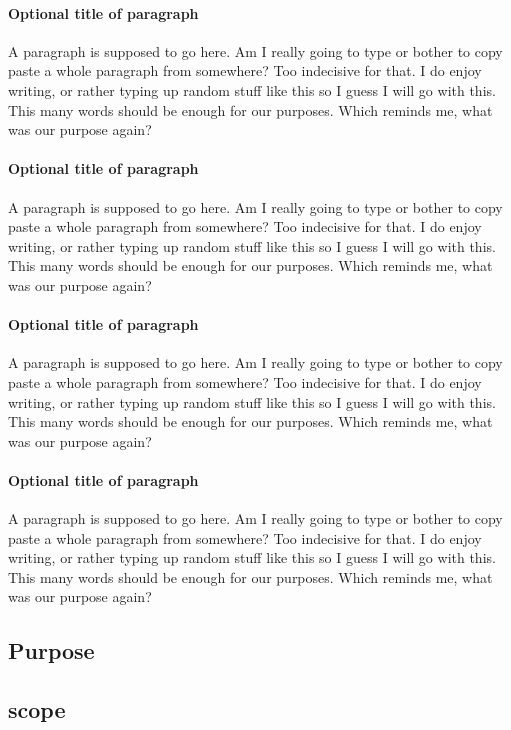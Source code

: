 \documentclass{article}
\begin{document}
	\paragraph{Optional title of paragraph}
	A paragraph is supposed to go here. Am I really going to type or bother to copy paste a whole paragraph from somewhere? Too indecisive for that. I do enjoy writing, or rather typing up random stuff like this so I guess I will go with this. This many words should be enough for our purposes. Which reminds me, what was our purpose again?

	\paragraph{Optional title of paragraph}
	A paragraph is supposed to go here. Am I really going to type or bother to copy paste a whole paragraph from somewhere? Too indecisive for that. I do enjoy writing, or rather typing up random stuff like this so I guess I will go with this. This many words should be enough for our purposes. Which reminds me, what was our purpose again?

	\paragraph{Optional title of paragraph}
	A paragraph is supposed to go here. Am I really going to type or bother to copy paste a whole paragraph from somewhere? Too indecisive for that. I do enjoy writing, or rather typing up random stuff like this so I guess I will go with this. This many words should be enough for our purposes. Which reminds me, what was our purpose again?

	\paragraph{Optional title of paragraph}
	A paragraph is supposed to go here. Am I really going to type or bother to copy paste a whole paragraph from somewhere? Too indecisive for that. I do enjoy writing, or rather typing up random stuff like this so I guess I will go with this. This many words should be enough for our purposes. Which reminds me, what was our purpose again?

	\subsection{Purpose}

	\subsection{scope}
\end{document}
